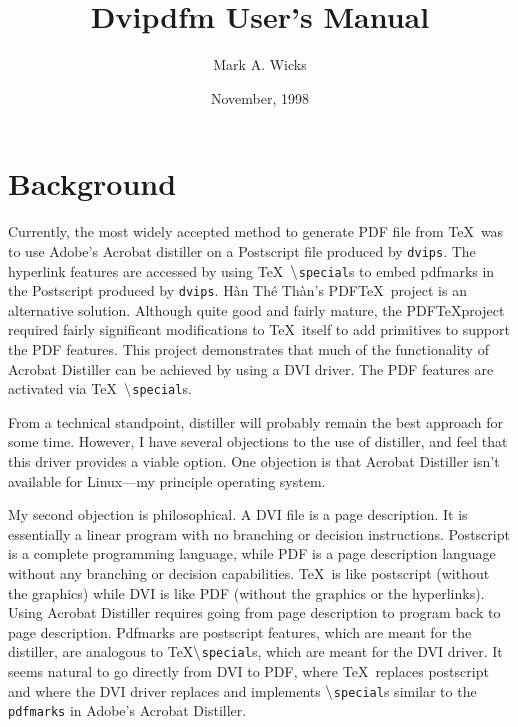 \def\subsection#1{\advance\ssectioncount by 1%
\bigskip\indent\setsubheading{\the\sectioncount.\the\ssectioncount\
	  #1}\par\nobreak\medskip}%
%
\def\display#1{\medskip\line{\quad #1\hfil}\medskip}
\def\example#1{\noindent{\it Example:\par\nobreak\noindent}}
%
\def\newpage{\vfill\eject}
%
\def\dvipdfm{{\tt dvipdfm}}%
\def\ttspecial{$\tt\backslash${\tt special}}%
%
\title{Dvipdfm User's Manual}
\author{Mark A. Wicks}
\date{November, 1998}
\maketitle
\section{Background}
Currently, 
the most widely accepted method to generate PDF file from \TeX\
was to use Adobe's Acrobat distiller on a Postscript file produced by {\tt dvips}.
The hyperlink features are accessed by using \TeX\ \ttspecial s
to embed pdfmarks in the Postscript produced by {\tt dvips}.
H\`an Th\'e Th\`an's PDF\TeX\ project is an alternative solution.
Although quite good and fairly mature, the PDF\TeX project required
fairly significant modifications to
\TeX\ itself to add primitives to support the PDF features.
This project demonstrates that much of the functionality
of Acrobat Distiller can be achieved by using a DVI driver.
The PDF features are activated via \TeX\ \ttspecial s.

From a technical standpoint,
distiller will probably remain the
best approach for some time.
However, I have several objections to the use of distiller,
and feel that this driver provides a viable option.
One objection is that Acrobat Distiller isn't available for Linux---my principle
operating system.

My second objection is philosophical.
A DVI file is a page description.
It is essentially a linear program with no branching or decision instructions.
Postscript is a complete programming language, while PDF is a page description language
without any branching or decision capabilities.
\TeX\ is like postscript (without the graphics)
while DVI is like PDF (without the graphics or the hyperlinks).
Using Acrobat Distiller requires going from page description to program back to page description.
Pdfmarks are postscript features, which are meant for the distiller, are
analogous to \TeX \ttspecial s, which are meant for the DVI driver.
It seems natural to go directly from DVI to PDF, where \TeX\ replaces
postscript and where the DVI driver replaces and implements
\ttspecial s similar to the {\tt pdfmarks} in Adobe's Acrobat Distiller.

